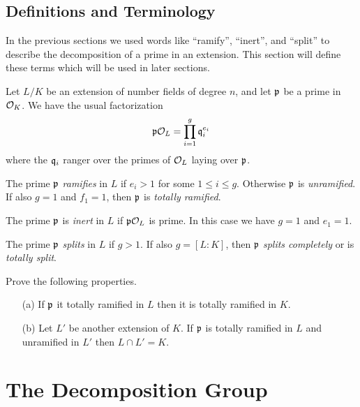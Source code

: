 \subsection{Definitions and Terminology}

In the previous sections we used words like ``ramify'',
``inert'', and ``split'' to describe the decomposition
of a prime in an extension. This section will define these
terms which will be used in later sections.

Let $L/K$ be an extension of number fields of degree $n$,
and let $\mathfrak{p}$ be a prime in $\mathcal{O}_K$. We have the usual factorization
$$
	\mathfrak{p}\mathcal{O}_L = \prod_{i=1}^g \mathfrak{q}_i^{e_i}
$$
where the $\mathfrak{q}_i$ ranger over the primes of $\mathcal{O}_L$ laying over $\mathfrak{p}$.

\begin{definition}\label{def:ramify}
	The prime $\mathfrak{p}$ \emph{ramifies} in $L$ if $e_i > 1$ for some $1\leq i\leq g$.
	Otherwise $\mathfrak{p}$ is \emph{unramified}.
	If also $g = 1$ and $f_1 = 1$, then $\mathfrak{p}$ is \emph{totally ramified}.
\end{definition}

\begin{definition}\label{def:inert}
	The prime $\mathfrak{p}$ is \emph{inert} in $L$ if $\mathfrak{p}\mathcal{O}_L$ is prime.
	In this case we have $g = 1$ and $e_1 = 1$.
\end{definition}

\begin{definition}\label{def:split}
	The prime $\mathfrak{p}$ \emph{splits} in $L$ if $g > 1$. If also $g = [L : K]$,
	then $\mathfrak{p}$ \emph{splits completely} or is \emph{totally split}.
\end{definition}

\begin{exercise}
	Prove the following properties.
	\begin{enumerate}
		\item[(a)] If $\mathfrak{p}$ it totally ramified in $L$
		then it is totally ramified in $K$.
		
		\item[(b)] Let $L'$ be another extension of $K$.
		If $\mathfrak{p}$ is totally ramified in $L$ and unramified in $L'$
		then $L\cap L' = K$.
	\end{enumerate}
\end{exercise}

\section{The Decomposition Group}


